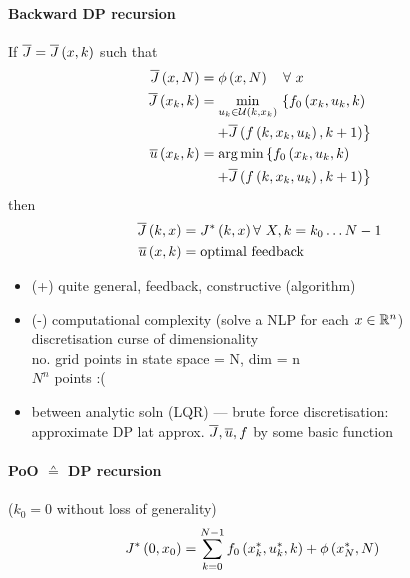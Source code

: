 \paragraph{Backward DP recursion}
If $\Jbar{} = \Jbar{x,k}$ such that
\begin{align}
    \Jbar{x,N} &= \phi \paren{x,N} \quad \forall ~ x\\
    \Jbar{x_k,k} &= \minuk{} \left\lbrace f_0 \paren{x_k,u_k,k} \right. \nonumber \\
        &\quad \left. + \Jbar{f\paren{k,x_k,u_k},k+1} \right\rbrace\\
    \ubar{x_k,k} &= \argmin \left\lbrace f_0 \paren{x_k,u_k,k} \right. \nonumber\\
        &\quad \left. + \Jbar{f\paren{k,x_k,u_k},k+1} \right\rbrace
\end{align}
then
\begin{align}
    \Jbar{k,x} &= J^* \paren{k,x} \forall ~ X, k = k_0 \dots N-1\\
    \ubar{x,k} &= \txt{optimal feedback}
\end{align}

\begin{itemize}
    \item (+) quite general, feedback, constructive (algorithm)
    \item (-) computational complexity (solve a NLP for each $x \in \mathbb{R}^n$)\\
        \lat{} discretisation \lat{} curse of dimensionality\\
        no. grid points in state space = N, dim = n\\
        {\color{red} $N^n$ points :( }
    \item between analytic soln (LQR) --- brute force discretisation:\\
        approximate DP lat{} approx. $\Jbar{}, \ubar{}, f$ by some basic function
\end{itemize}

\paragraph{PoO $\corresponds$ DP recursion} ($k_0 = 0$ without loss of generality)
\begin{align*}
    J^* \paren{0,x_0} &= \sum_{k=0}^{N-1} f_0 \paren{x^*_k,u^*_k,k} + \phi \paren{x^{*}_N, N}%
\end{align*}


